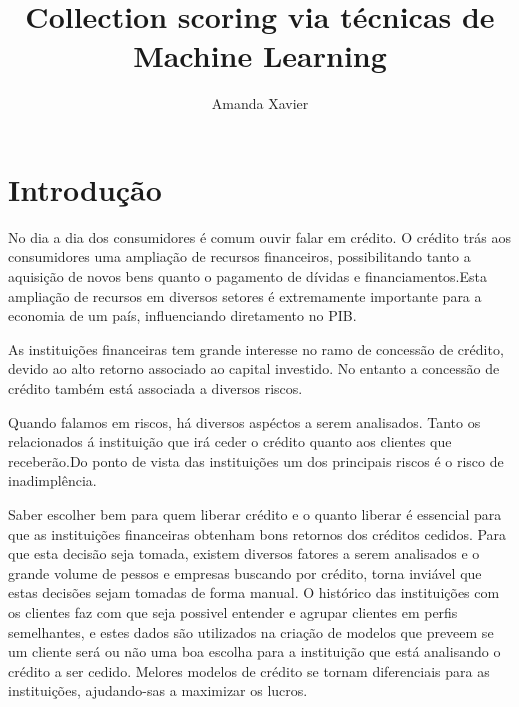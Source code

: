 \documentclass[12pt,a4paper]{article}
\title{Collection scoring via técnicas de Machine Learning} %
\author{Amanda Xavier} %
\begin{document}




\maketitle %

\newpage


\tableofcontents %
\listoffigures %
\listoftables %

\newpage

\section{Introdução} %



    No dia a dia dos consumidores é comum ouvir falar em crédito. O crédito trás aos consumidores uma ampliação de recursos financeiros, possibilitando tanto a aquisição de novos bens quanto o pagamento de dívidas e financiamentos.Esta ampliação de recursos em diversos setores é extremamente importante para a economia de um país, influenciando diretamento no PIB.
    
    As instituições financeiras tem grande interesse no ramo de concessão de crédito, devido ao alto retorno associado ao capital investido. No entanto a concessão de crédito também  está associada a diversos riscos. 
    
    Quando falamos em riscos, há diversos aspéctos a serem analisados. Tanto os relacionados á instituição que irá ceder o crédito quanto aos clientes que receberão.Do ponto de vista das instituições um dos principais riscos é o risco de inadimplência.
    
    Saber escolher bem para quem liberar crédito e o quanto liberar é essencial para que as instituições financeiras obtenham bons retornos dos créditos cedidos. Para que esta decisão seja tomada, existem diversos fatores a serem analisados e o grande volume de pessos e empresas buscando por crédito, torna inviável que estas decisões sejam tomadas de forma manual. O histórico das instituições com os clientes faz com que seja possivel entender e agrupar clientes em perfis semelhantes, e estes dados são utilizados na criação de modelos que preveem se um cliente será ou não uma boa escolha para a instituição que está analisando o crédito a ser cedido. Melores modelos de crédito se tornam diferenciais para as instituições, ajudando-sas a maximizar os lucros.
    
\end{document}
